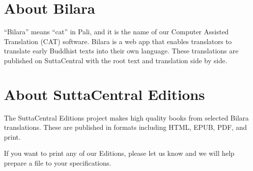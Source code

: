 \documentclass[12pt,openany]{book}%
\begin{document}
\section*{About Bilara}

“Bilara” means “cat” in Pali, and it is the name of our Computer Assisted Translation (CAT) software. Bilara is a web app that enables translators to translate early Buddhist texts into their own language. These translations are published on SuttaCentral with the root text and translation side by side.

\section*{About SuttaCentral Editions}

The SuttaCentral Editions project makes high quality books from selected Bilara translations. These are published in formats including HTML, EPUB, PDF, and print.

If you want to print any of our Editions, please let us know and we will help prepare a file to your specifications.

%
\end{document}
